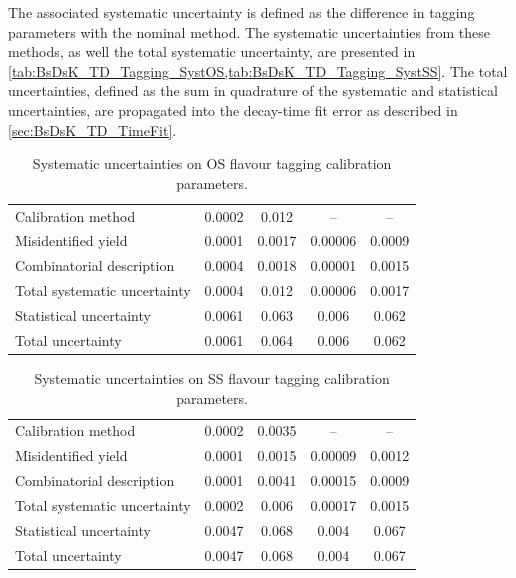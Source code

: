 The associated systematic uncertainty is defined as the difference in tagging parameters with the nominal method.
The systematic uncertainties from these methods, as well the total systematic uncertainty, are presented in \cref{tab:BsDsK_TD_Tagging_SystOS,tab:BsDsK_TD_Tagging_SystSS}.
The total uncertainties, defined as the sum in quadrature of the systematic and statistical uncertainties, are propagated into the decay-time fit error as described in \cref{sec:BsDsK_TD_TimeFit}.
%
\begin{table}[htb] \centerfloat
    \caption{
        Systematic uncertainties on OS flavour tagging calibration parameters.}
    \label{tab:BsDsK_TD_Tagging_SystOS}
    \begin{tabular}{l*{2}{S[table-format=.4]}S[table-format=.5]S[table-format=.4]}
        \toprule
                                     & {} & {} & {} & {} \tabularnewline
        \midrule
        Calibration method           & 0.0002   & 0.012    & {--}      & {--} \tabularnewline
        Misidentified yield          & 0.0001   & 0.0017   & 0.00006   & 0.0009 \tabularnewline
        Combinatorial description    & 0.0004   & 0.0018   & 0.00001   & 0.0015 \tabularnewline
        \midrule
        Total systematic uncertainty & 0.0004   & 0.012    & 0.00006   & 0.0017 \tabularnewline
        Statistical uncertainty      & 0.0061   & 0.063    & 0.006     & 0.062 \tabularnewline
        \midrule
        Total uncertainty            & 0.0061   & 0.064    & 0.006     & 0.062 \tabularnewline
        \bottomrule
    \end{tabular}
\end{table}
%
\begin{table}[htb] \centerfloat
    \caption{
        Systematic uncertainties on SS flavour tagging calibration parameters.}
    \label{tab:BsDsK_TD_Tagging_SystSS}
    \begin{tabular}{l*{2}{S[table-format=.4]}S[table-format=.5]S[table-format=.4]}
        \toprule
                                     & {} & {} & {} & {} \tabularnewline
        \midrule
        Calibration method           & 0.0002   & 0.0035   & {--}      & {--} \tabularnewline
        Misidentified yield          & 0.0001   & 0.0015   & 0.00009   & 0.0012 \tabularnewline
        Combinatorial description    & 0.0001   & 0.0041   & 0.00015   & 0.0009 \tabularnewline
        \midrule
        Total systematic uncertainty & 0.0002   & 0.006    & 0.00017   & 0.0015 \tabularnewline
        Statistical uncertainty      & 0.0047   & 0.068    & 0.004     & 0.067 \tabularnewline
        \midrule
        Total uncertainty            & 0.0047   & 0.068    & 0.004     & 0.067 \tabularnewline
        \bottomrule
    \end{tabular}
\end{table}

